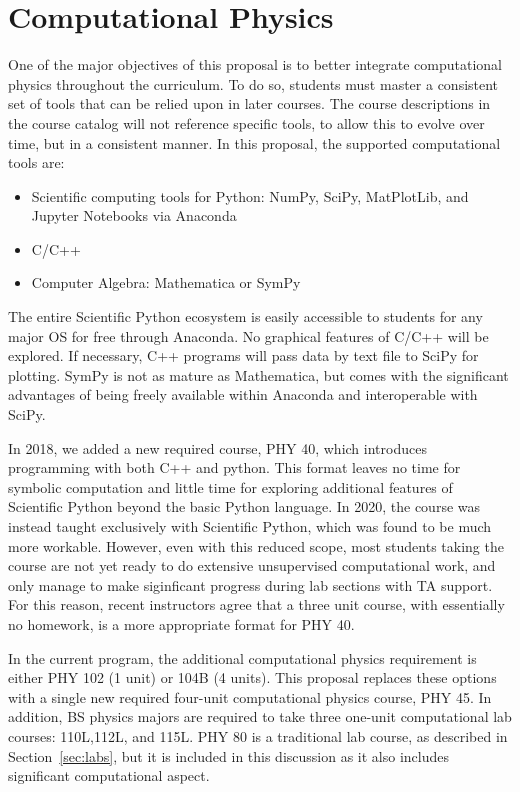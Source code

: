 \documentclass[12pt]{article}
\begin{document}
\section{Computational Physics}
\label{sec:computing}

One of the major objectives of this proposal is to better integrate
computational physics throughout the curriculum.  To do so, students
must master a consistent set of tools that can be relied upon in later
courses.  The course descriptions in the course catalog will not
reference specific tools, to allow this to evolve over time, but in a
consistent manner.  In this proposal, the supported computational
tools are:
\begin{itemize}
\item Scientific computing tools for Python: NumPy, SciPy, MatPlotLib,
  and Jupyter Notebooks via Anaconda
\item C/C++
\item Computer Algebra:  Mathematica or SymPy
\end{itemize}
The entire Scientific Python ecosystem is easily accessible to
students for any major OS for free through Anaconda.  No graphical
features of C/C++ will be explored.  If necessary, C++ programs will
pass data by text file to SciPy for plotting.  SymPy is not as mature
as Mathematica, but comes with the significant advantages of being
freely available within Anaconda and interoperable with SciPy.

In 2018, we added a new required course, PHY 40, which introduces
programming with both C++ and python.  This format leaves no time for
symbolic computation and little time for exploring additional features
of Scientific Python beyond the basic Python language.  In 2020, the
course was instead taught exclusively with Scientific Python, which
was found to be much more workable.  However, even with this reduced
scope, most students taking the course are not yet ready to do
extensive unsupervised computational work, and only manage to make
siginficant progress during lab sections with TA support.  For this
reason, recent instructors agree that a three unit course, with
essentially no homework, is a more appropriate format for PHY 40.

In the current program, the additional computational physics
requirement is either PHY 102 (1 unit) or 104B (4 units).  This
proposal replaces these options with a single new required four-unit
computational physics course, PHY 45.  In addition, BS physics majors
are required to take three one-unit computational lab courses:
110L,112L, and 115L.  PHY 80 is a traditional lab course, as described in
Section~\ref{sec:labs}, but it is included in this discussion as it
also includes significant computational aspect.
\end{document}
